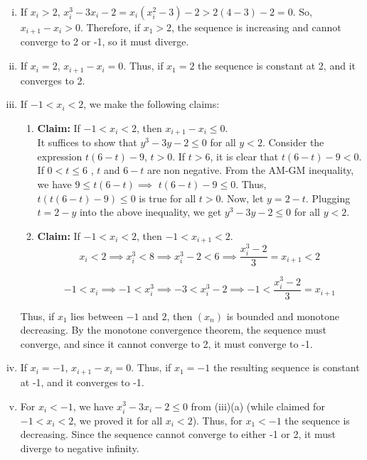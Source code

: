 \documentclass[12pt]{article}
\begin{document}
\begin{enumerate}[(i)]
      \item If $x_{i} > 2$, $x_{i}^{3}-3x_{i}-2 = x_{i}(x_{i}^{2}-3)-2>2(4-3)-2=0$. So, $x_{i+1}-x_{i}>0$. Therefore, if $x_1>2$, the sequence is increasing and cannot converge to 2 or -1, so it must diverge.
      \item If $x_{i} = 2$, $x_{i+1} -x_{i}=0$. Thus, if $x_1 =2$ the sequence is constant at 2, and it converges to 2.
      \item If $-1<x_{i}<2$, we make the following claims:
            \begin{enumerate}
                  \item {\bf Claim: }If $-1<x_{i}<2$, then $x_{i+1}-x_{i}\leq0$.\\
                        It suffices to show that $y^{3}-3y-2\leq0$ for all $y<2$.
                        Consider the expression $t(6-t)-9$, $t>0$. If $t>6$, it is clear that $t(6-t)-9 <0$. If $0<t\le 6$ , $t$ and $6-t$ are non negative. From the AM-GM inequality, we have $9\le t(6-t) \implies$  $t(6-t)-9\le 0$. Thus, $t(t(6-t)-9)\le 0$ is true for all $t>0$. Now, let $y=2-t$. Plugging $t=2-y$ into the above inequality, we get ${{{y}^{3}}-{3y}-2}\le 0$ for all $y<2$.
                  \item {\bf Claim: }If $-1<x_{i}<2$, then $-1<x_{i+1}<2$.\\
                        \begin{equation*}
                              x_{i}<2
                              \implies x_{i}^{3}<8
                              \implies  x_{i}^{3}-2<6
                              \implies  \frac{{x_{i}^{3}-2}}{3}=x_{i+1}<2
                        \end{equation*}

                        \begin{equation*}
                              -1<x_{i}
                              \implies  -1<x_{i}^{3}
                              \implies  -3<x_{i}^{3}-2
                              \implies  -1< \frac{{x_{i}^{3}-2}}{3} = x_{i+1}
                        \end{equation*}
            \end{enumerate}
            Thus, if $x_{1}$ lies between $-1$ and $2$, then $(x_{n})$ is bounded and monotone decreasing. By the monotone convergence theorem, the sequence must converge, and since it cannot converge to 2, it must converge to -1.
      \item If $x_{i} = -1$, $x_{i+1} -x_{i}=0$. Thus, if $x_1 = -1$ the resulting sequence is constant at -1, and it converges to -1.
      \item For $x_i < -1$, we have $x_i^3 - 3x_i - 2 \le 0$ from (iii)(a) (while claimed for $-1<x_i<2$, we proved it for all $x_i<2$). Thus, for $x_1<-1$ the sequence is decreasing. Since the sequence cannot converge to either -1 or 2, it must diverge to negative infinity.
\end{enumerate}
\end{document}
